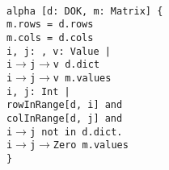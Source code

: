 \begin{myquote}\small{\texttt{\\
\Bpred alpha [d: DOK, m: Matrix] \{\\
\TA m.rows = d.rows\\
\TA m.cols = d.cols\\
\TA \Ball i, j: \Bint, v: Value |\\
\TB i$\rightarrow$j$\rightarrow$v \Bin d.dict \Bimplies\\
\TC i$\rightarrow$j$\rightarrow$v \Bin m.values\\
\TA \Ball i, j: Int |\\
\TB rowInRange[d, i] and\\
\TB colInRange[d, j] and\\
\TB i$\rightarrow$j not in d.dict.\Buniv~\Bimplies\\
\TC i$\rightarrow$j$\rightarrow$Zero \Bin m.values\\
\}
}}
\end{myquote}